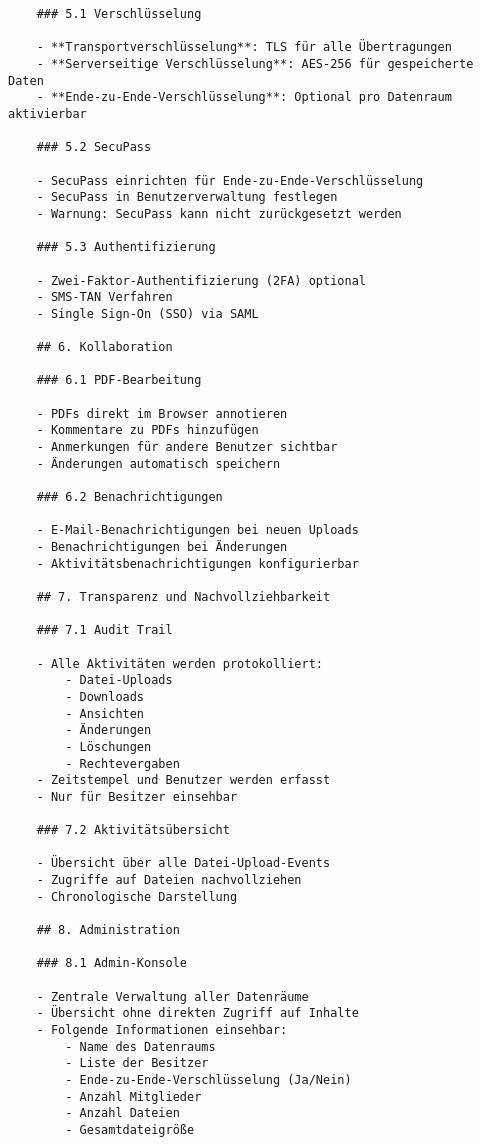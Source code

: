 \begin{verbatim}
    ### 5.1 Verschlüsselung
    
    - **Transportverschlüsselung**: TLS für alle Übertragungen
    - **Serverseitige Verschlüsselung**: AES-256 für gespeicherte Daten
    - **Ende-zu-Ende-Verschlüsselung**: Optional pro Datenraum aktivierbar
    
    ### 5.2 SecuPass
    
    - SecuPass einrichten für Ende-zu-Ende-Verschlüsselung
    - SecuPass in Benutzerverwaltung festlegen
    - Warnung: SecuPass kann nicht zurückgesetzt werden
    
    ### 5.3 Authentifizierung
    
    - Zwei-Faktor-Authentifizierung (2FA) optional
    - SMS-TAN Verfahren
    - Single Sign-On (SSO) via SAML
    
    ## 6. Kollaboration
    
    ### 6.1 PDF-Bearbeitung
    
    - PDFs direkt im Browser annotieren
    - Kommentare zu PDFs hinzufügen
    - Anmerkungen für andere Benutzer sichtbar
    - Änderungen automatisch speichern
    
    ### 6.2 Benachrichtigungen
    
    - E-Mail-Benachrichtigungen bei neuen Uploads
    - Benachrichtigungen bei Änderungen
    - Aktivitätsbenachrichtigungen konfigurierbar
    
    ## 7. Transparenz und Nachvollziehbarkeit
    
    ### 7.1 Audit Trail
    
    - Alle Aktivitäten werden protokolliert:
        - Datei-Uploads
        - Downloads
        - Ansichten
        - Änderungen
        - Löschungen
        - Rechtevergaben
    - Zeitstempel und Benutzer werden erfasst
    - Nur für Besitzer einsehbar
    
    ### 7.2 Aktivitätsübersicht
    
    - Übersicht über alle Datei-Upload-Events
    - Zugriffe auf Dateien nachvollziehen
    - Chronologische Darstellung
    
    ## 8. Administration
    
    ### 8.1 Admin-Konsole
    
    - Zentrale Verwaltung aller Datenräume
    - Übersicht ohne direkten Zugriff auf Inhalte
    - Folgende Informationen einsehbar:
        - Name des Datenraums
        - Liste der Besitzer
        - Ende-zu-Ende-Verschlüsselung (Ja/Nein)
        - Anzahl Mitglieder
        - Anzahl Dateien
        - Gesamtdateigröße
    

\end{verbatim}
